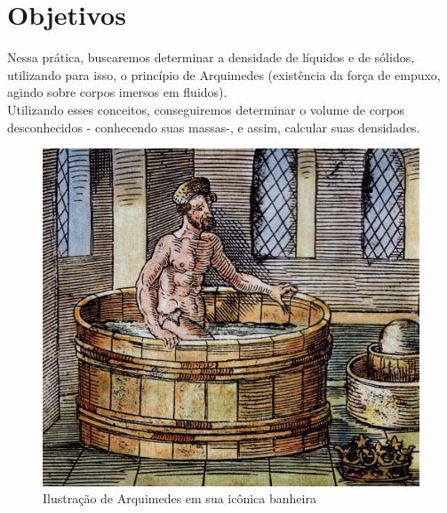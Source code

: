 \newpage
\section{Objetivos}

Nessa prática, buscaremos determinar a densidade de líquidos e de sólidos, utilizando para isso, o princípio de Arquimedes (existência da força de empuxo, agindo sobre corpos imersos em fluidos).\\

Utilizando esses conceitos, conseguiremos determinar o volume de corpos desconhecidos - conhecendo suas massas-, e assim, calcular suas densidades.  \\

\begin{figure}[H]
    \centering
    \includegraphics[scale=0.4]{images/Arquimedes.png}
    \caption{Ilustração de Arquimedes em sua icônica banheira}
\end{figure}

